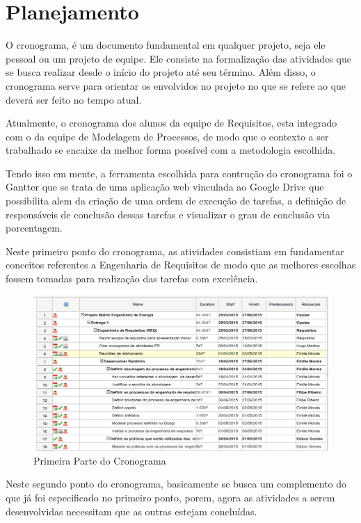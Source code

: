 \chapter[Planejamento]{Planejamento}
O cronograma, é um documento fundamental em qualquer projeto, seja ele pessoal ou um projeto de equipe. Ele consiste na formalização das atividades que se busca realizar desde o início do projeto até seu término. Além disso, o cronograma serve para orientar os envolvidos no projeto no que se refere ao que deverá ser feito no tempo atual.

Atualmente, o cronograma dos alunos da equipe de Requisitos, esta integrado com o da equipe de Modelagem de Processos, de modo que o contexto a ser trabalhado se encaixe da melhor forma possível com a metodologia escolhida.

Tendo isso em mente, a ferramenta escolhida para contrução do cronograma foi o Gantter que se trata de uma aplicação web vinculada ao Google Drive que possibilita alem da criação de uma ordem de execução de tarefas, a definição de responsáveis de conclusão dessas tarefas e visualizar o grau de conclusão via porcentagem.

Neste primeiro ponto do cronograma, as atividades consistiam em fundamentar conceitos referentes a Engenharia de Requisitos de modo que as melhores escolhas fossem tomadas para realização das tarefas com excelência.

\begin{figure}[!htb]
\centering
\includegraphics[scale=0.55]{figuras/cronograma1.png}
\caption{Primeira Parte do Cronograma}
\end{figure}

Neste segundo ponto do cronograma, basicamente se busca um complemento do que já foi especificado no primeiro ponto, porem, agora as atividades a serem desenvolvidas necessitam que as outras estejam concluídas.

